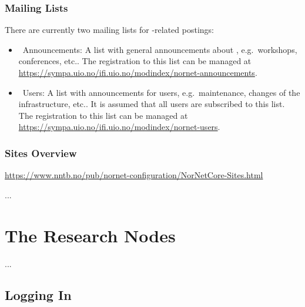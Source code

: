 \subsection{Mailing Lists}

There are currently two mailing lists for -related postings:

\begin{itemize}
 \item {}~Announcements:
 A list with general announcements about , e.g.\ workshops, conferences, etc..
 The registration to this list can be managed at \url{https://sympa.uio.no/ifi.uio.no/modindex/nornet-announcements}.

 \item {}~Users:
 A list with announcements for  users, e.g.\ maintenance, changes of the infrastructure, etc.. It is assumed that all  users are subscribed to this list.
 The registration to this list can be managed at \url{https://sympa.uio.no/ifi.uio.no/modindex/nornet-users}.
\end{itemize}


\subsection{Sites Overview}

\url{https://www.nntb.no/pub/nornet-configuration/NorNetCore-Sites.html}

...



\chapter{The Research Nodes}
\label{cha:Research-Nodes}

...

\section{Logging In}
\label{sec:Logging-In}

